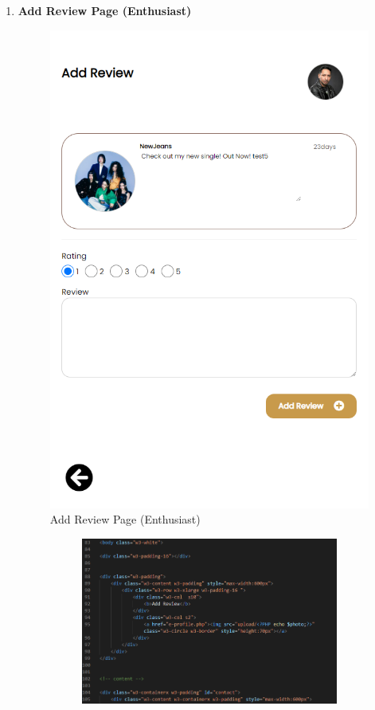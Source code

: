 \begin{enumerate}[1.]
    \item \textbf{Add Review Page (Enthusiast)}
    \begin{figure}[h]
        \centering
        \includegraphics[width=0.5\linewidth]{mainmatter/images/frontend/ss/Add Review (Enthusiast).png}
        \caption{Add Review Page (Enthusiast)}
        \label{fig:myfig67}
    \end{figure}
    \begin{figure}[h]\ContinuedFloat
        \centering
        \begin{subfigure}[b]{0.7\textwidth}
            \centering
            \includegraphics[width=\textwidth]{mainmatter/images/frontend/code/eaddreview.png}
            \label{fig:sub1}
        \end{subfigure}
        \hspace{0.04\textwidth}

\end{figure}
\end{enumerate}
